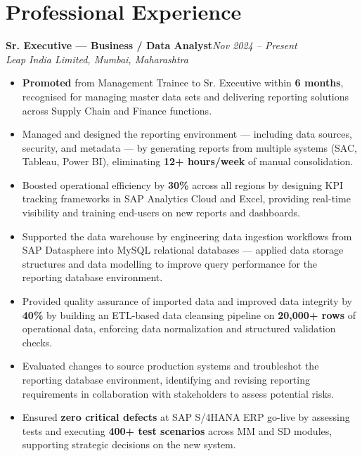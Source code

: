 \documentclass[10pt, letterpaper]{article}
\newcommand{\role}[3]{%
  \vspace{2pt}%
  {\bfseries #1}\hfill{\small\color{muted}\textit{#3}}\\[-2pt]%
  {\small\color{muted}\textit{#2}}%
}
\begin{document}
\section{Professional Experience}

\role{Sr. Executive — Business / Data Analyst}{Leap India Limited, Mumbai, Maharashtra}{Nov 2024 – Present}

\begin{itemize}
  \item \textbf{Promoted} from Management Trainee to Sr. Executive within \textbf{6 months}, recognised for managing master data sets and delivering reporting solutions across Supply Chain and Finance functions.
  \item Managed and designed the reporting environment — including data sources, security, and metadata — by generating reports from multiple systems (SAC, Tableau, Power BI), eliminating \textbf{12+ hours/week} of manual consolidation.
  \item Boosted operational efficiency by \textbf{30\%} across all regions by designing KPI tracking frameworks in SAP Analytics Cloud and Excel, providing real-time visibility and training end-users on new reports and dashboards.
  \item Supported the data warehouse by engineering data ingestion workflows from SAP Datasphere into MySQL relational databases — applied data storage structures and data modelling to improve query performance for the reporting database environment.
  \item Provided quality assurance of imported data and improved data integrity by \textbf{40\%} by building an ETL-based data cleansing pipeline on \textbf{20,000+ rows} of operational data, enforcing data normalization and structured validation checks.
  \item Evaluated changes to source production systems and troubleshot the reporting database environment, identifying and revising reporting requirements in collaboration with stakeholders to assess potential risks.
  \item Ensured \textbf{zero critical defects} at SAP S/4HANA ERP go-live by assessing tests and executing \textbf{400+ test scenarios} across MM and SD modules, supporting strategic decisions on the new system.
\end{itemize}

\vspace{1pt}
\end{document}
